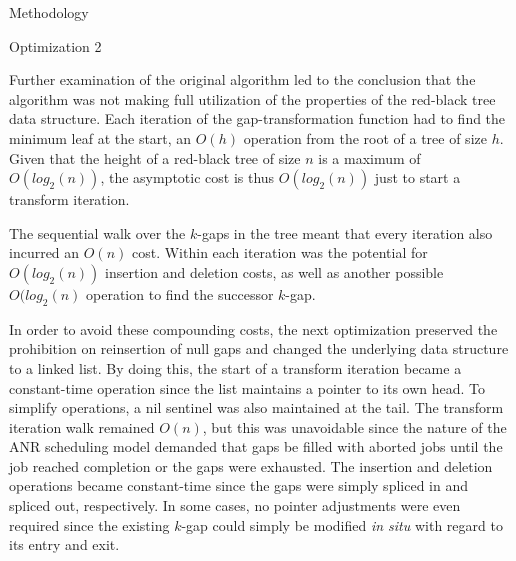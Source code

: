 \documentclass{article}
\begin{document}
\begin{section}{Methodology}
  \begin{subsection}{Optimization 2}
    \begin{paragraph}{}
      Further examination of the original algorithm led to the conclusion that the
      algorithm was not making full utilization of the properties of the red-black tree
      data structure.
      Each iteration of the gap-transformation function had to find the minimum leaf
      at the start, an $O(h)$ operation from the root of a tree of size $h$\autocite[246-249]{CLR}.
      Given that the height of a red-black tree of size $n$ is a maximum of $O(log_{2}(n))$\autocite[263-265]{CLR},
      the asymptotic cost is thus $O(log_{2}(n))$ just to start a transform iteration.
    \end{paragraph}
    \begin{paragraph}{}
      The sequential walk over the $k$-gaps in the tree meant that every iteration also
      incurred an $O(n)$ cost. Within each iteration was the potential for $O(log_{2}(n))$
      insertion and deletion costs\autocite[268-277]{CLR}, as well as another possible
      $O(log_{2}(n)$ operation to find the successor $k$-gap.
    \end{paragraph}
    \begin{paragraph}{}
      In order to avoid these compounding costs, the next optimization preserved the
      prohibition on reinsertion of null gaps and changed the underlying data structure
      to a linked list. By doing this, the start of a transform iteration became a
      constant-time operation since the list maintains a pointer to its own head.
      To simplify operations, a nil sentinel was also maintained at the tail.
      The transform iteration walk remained $O(n)$, but this was unavoidable since
      the nature of the ANR scheduling model demanded that gaps be filled with
      aborted jobs until the job reached completion or the gaps were exhausted.
      The insertion and deletion operations became constant-time since the gaps
      were simply spliced in and spliced out, respectively. In some cases, no pointer
      adjustments were even required since the existing $k$-gap could simply be modified
      \emph{in situ} with regard to its entry and exit.
    \end{paragraph}
    \begin{algorithm}[H]
      \caption{Gap-Tranformation Algorithm Optimization 2: No Zero Gaps Reinserted, Linked List}\label{gapxfrm2}
      \begin{algorithmic}[2]

\end{algorithmic}
\end{algorithm}
\end{subsection}
\end{section}
\end{document}
